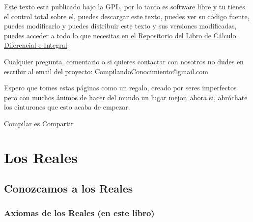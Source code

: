 \documentclass[12pt, fleqn]{report}                             %
\theoremstyle{break}                                            %
\begin{document}
    Este texto esta publicado bajo la GPL, por lo tanto es software libre y tu tienes el control total sobre
    el, puedes descargar este texto, puedes ver su código fuente, puedes modificarlo y puedes distribuir este
    texto y sus versiones modificadas, puedes acceder a todo lo que necesitas 
    \href{http://www.github.com/CompilandoConocimiento/LibroCalculoDiferencialEIntegral}
    {\underline{en el Repositorio del Libro de Cálculo Diferencial e Integral}}. 

    Cualquier pregunta, comentario o si quieres contactar con nosotros no dudes en escribir al email del proyecto:
    CompilandoConocimiento@gmail.com

    Espero que tomes estas páginas como un regalo, creado por seres imperfectos pero con muchos ánimos de hacer
    del mundo un lugar mejor, ahora si, abróchate los cinturones que esto acaba de empezar.

    \begin{flushright}
        Compilar es Compartir
    \end{flushright}




\part{Los Reales}

    \chapter{Conozcamos a los Reales}
        \clearpage

        \section{Axiomas de los Reales (en este libro)}
\end{document}
